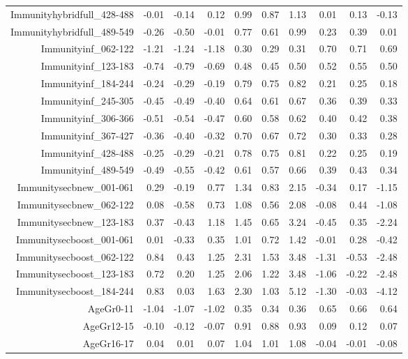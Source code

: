 \begin{table}[ht]
\begin{tabular}{rrrrrrrrrr}
  Immunityhybridfull\_428-488 & -0.01 & -0.14 & 0.12 & 0.99 & 0.87 & 1.13 & 0.01 & 0.13 & -0.13 \\ 
  Immunityhybridfull\_489-549 & -0.26 & -0.50 & -0.01 & 0.77 & 0.61 & 0.99 & 0.23 & 0.39 & 0.01 \\ 
  Immunityinf\_062-122 & -1.21 & -1.24 & -1.18 & 0.30 & 0.29 & 0.31 & 0.70 & 0.71 & 0.69 \\ 
  Immunityinf\_123-183 & -0.74 & -0.79 & -0.69 & 0.48 & 0.45 & 0.50 & 0.52 & 0.55 & 0.50 \\ 
  Immunityinf\_184-244 & -0.24 & -0.29 & -0.19 & 0.79 & 0.75 & 0.82 & 0.21 & 0.25 & 0.18 \\ 
  Immunityinf\_245-305 & -0.45 & -0.49 & -0.40 & 0.64 & 0.61 & 0.67 & 0.36 & 0.39 & 0.33 \\ 
  Immunityinf\_306-366 & -0.51 & -0.54 & -0.47 & 0.60 & 0.58 & 0.62 & 0.40 & 0.42 & 0.38 \\ 
  Immunityinf\_367-427 & -0.36 & -0.40 & -0.32 & 0.70 & 0.67 & 0.72 & 0.30 & 0.33 & 0.28 \\ 
  Immunityinf\_428-488 & -0.25 & -0.29 & -0.21 & 0.78 & 0.75 & 0.81 & 0.22 & 0.25 & 0.19 \\ 
  Immunityinf\_489-549 & -0.49 & -0.55 & -0.42 & 0.61 & 0.57 & 0.66 & 0.39 & 0.43 & 0.34 \\ 
  Immunitysecbnew\_001-061 & 0.29 & -0.19 & 0.77 & 1.34 & 0.83 & 2.15 & -0.34 & 0.17 & -1.15 \\ 
  Immunitysecbnew\_062-122 & 0.08 & -0.58 & 0.73 & 1.08 & 0.56 & 2.08 & -0.08 & 0.44 & -1.08 \\ 
  Immunitysecbnew\_123-183 & 0.37 & -0.43 & 1.18 & 1.45 & 0.65 & 3.24 & -0.45 & 0.35 & -2.24 \\ 
  Immunitysecboost\_001-061 & 0.01 & -0.33 & 0.35 & 1.01 & 0.72 & 1.42 & -0.01 & 0.28 & -0.42 \\ 
  Immunitysecboost\_062-122 & 0.84 & 0.43 & 1.25 & 2.31 & 1.53 & 3.48 & -1.31 & -0.53 & -2.48 \\ 
  Immunitysecboost\_123-183 & 0.72 & 0.20 & 1.25 & 2.06 & 1.22 & 3.48 & -1.06 & -0.22 & -2.48 \\ 
  Immunitysecboost\_184-244 & 0.83 & 0.03 & 1.63 & 2.30 & 1.03 & 5.12 & -1.30 & -0.03 & -4.12 \\ 
  AgeGr0-11 & -1.04 & -1.07 & -1.02 & 0.35 & 0.34 & 0.36 & 0.65 & 0.66 & 0.64 \\ 
  AgeGr12-15 & -0.10 & -0.12 & -0.07 & 0.91 & 0.88 & 0.93 & 0.09 & 0.12 & 0.07 \\ 
  AgeGr16-17 & 0.04 & 0.01 & 0.07 & 1.04 & 1.01 & 1.08 & -0.04 & -0.01 & -0.08 \\ 

\end{tabular}
\end{table}
